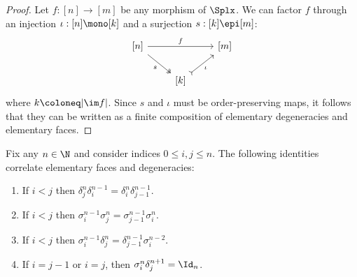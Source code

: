 \begin{proof}
Let \(f: [n] \to [m]\) be any morphism of \(\Splx\). We can factor \(f\) through
an injection \(\iota: [n] \mono [k]\) and a surjection \(s: [k] \epi [m]\):
\[
\begin{tikzcd}
{[n]} \ar[rr, "f"] \ar[dr, two heads, "s"'] &&{[m]} \\
&{[k]} \ar[ru, tail, "\iota"'] &
\end{tikzcd}
\]
where \(k \coloneq |\im f|\). Since \(s\) and \(\iota\) must be order-preserving
maps, it follows that they can be written as a finite composition of elementary
degeneracies and elementary faces.
\end{proof}

\begin{corollary}
\label{cor:cosimplicial-identities}
Fix any \(n \in \N\) and consider indices \(0 \leq i, j \leq n\). The following
identities correlate elementary faces and degeneracies:
\begin{enumerate}[(1)]\setlength\itemsep{0em}
\item If \(i < j\) then
  \(\delta_j^n \delta_i^{n-1} = \delta_i^n \delta_{j-1}^{n-1}\).

\item If \(i < j\) then
  \(\sigma_i^{n-1} \sigma_j^n = \sigma_{j-1}^{n-1} \sigma_i^n \).

\item If \(i < j\) then
  \(\sigma_i^{n-1} \delta_j^n = \delta_{j-1}^{n-1} \sigma_i^{n-2}\).

\item If \(i = j - 1\) or \(i = j\), then \(\sigma_i^n \delta_j^{n+1} = \Id_n\).


\end{enumerate}
\end{corollary}
